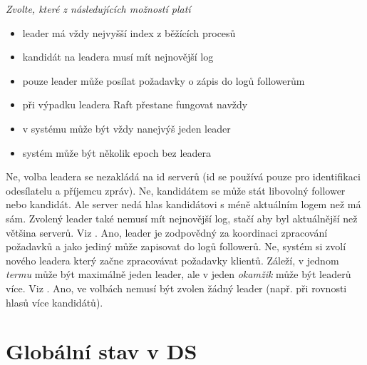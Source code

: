 \documentclass[usenames,dvipsnames,9pt]{beamer}
\begin{document}
{\begin{frame}[fragile]
\vspace{1em}

{\em Zvolte, které z následujících možností platí}

\begin{itemize}
\item leader má vždy nejvyšší index z běžících procesů 
\item kandidát na leadera musí mít nejnovější log  
\item pouze leader může posílat požadavky o zápis do logů followerům 
\item při výpadku leadera Raft přestane fungovat navždy 
\item v systému může být vždy nanejvýš jeden leader 
\item systém může být několik epoch bez leadera 
\end{itemize}
\vspace{1em}
\begin{overprint}[\textwidth]
   Ne, volba leadera se nezakládá na id serverů (id se používá pouze pro identifikaci odesílatelu a příjemcu zpráv).
   Ne, kandidátem se může stát libovolný follower nebo kandidát. Ale server nedá hlas kandidátovi s méně aktuálním logem než má sám. Zvolený leader také nemusí mít nejnovější log, stačí aby byl aktuálnější než většina serverů. Viz \href{https://www.cs.princeton.edu/courses/archive/fall16/cos418/papers/raft.pdf}{}.
   Ano, leader je zodpovědný za koordinaci zpracování požadavků a jako jediný může zapisovat do logů followerů. 
   Ne, systém si zvolí nového leadera který začne zpracovávat požadavky klientů. 
   Záleží, v jednom \emph{termu} může být maximálně jeden leader, ale v jeden \emph{okamžik} může být leaderů více. Viz \href{http://thesecretlivesofdata.com/raft/}{}.
   Ano, ve volbách nemusí být zvolen žádný leader (např. při rovnosti hlasů více kandidátů).
\end{overprint}
\end{frame}
}

\section{Globální stav v DS}
\end{document}
